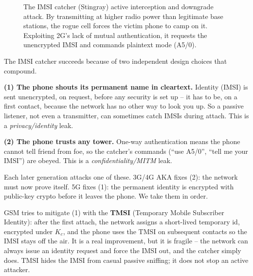\begin{figure}[H]
\caption{The IMSI catcher (Stingray) active interception and downgrade attack. By transmitting at higher
radio power than legitimate base stations, the rogue cell forces the victim phone to camp on it.
Exploiting 2G's lack of mutual authentication, it requests the unencrypted IMSI and commands plaintext mode (A5/0).}
\label{ch29:fig-imsi-catcher}
\end{figure}

\begin{intuitionbox}
The IMSI catcher succeeds because of two independent design choices that compound.

\textbf{(1) The phone shouts its permanent name in cleartext.} Identity (IMSI) is sent unencrypted, on request, before any security is set up -- it has to be, on a first contact, because the network has no other way to look you up. So a passive listener, not even a transmitter, can sometimes catch IMSIs during attach. This is a \emph{privacy/identity} leak.

\textbf{(2) The phone trusts any tower.} One-way authentication means the phone cannot tell friend from foe, so the catcher's commands (``use A5/0'', ``tell me your IMSI'') are obeyed. This is a \emph{confidentiality/MITM} leak.

Each later generation attacks one of these. 3G/4G AKA fixes (2): the network must now prove itself. 5G fixes (1): the permanent identity is encrypted with public-key crypto before it leaves the phone. We take them in order.
\end{intuitionbox}

GSM tries to mitigate (1) with the \textbf{TMSI} (Temporary Mobile Subscriber Identity): after the first attach, the network assigns a short-lived temporary id, encrypted under $K_c$, and the phone uses the TMSI on subsequent contacts so the IMSI stays off the air. It is a real improvement, but it is fragile -- the network can always issue an identity request and force the IMSI out, and the catcher simply does. TMSI hides the IMSI from casual passive sniffing; it does not stop an active attacker.

